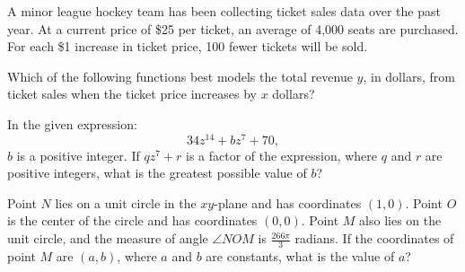 \vspace{0.75em}


\vspace{2em}
\newpage

\noindent\markforreview
\vspace{1em}

A minor league hockey team has been collecting ticket sales data over the past year.
At a current price of \$25 per ticket, an average of 4{,}000 seats are purchased.
For each \$1 increase in ticket price, 100 fewer tickets will be sold.

Which of the following functions best models the total revenue \(y\), in dollars,
from ticket sales when the ticket price increases by \(x\) dollars?

\vspace{0.75em}


\vspace{2em}
\newpage

\noindent\markforreview
\vspace{1em}

In the given expression:
\[
34z^{14} + bz^7 + 70,
\]
\(b\) is a positive integer. If \(qz^7 + r\) is a factor of the expression, where \(q\) and \(r\) are positive integers,
what is the greatest possible value of \(b\)?

\vspace{2em}
\newpage

\noindent\markforreview
\vspace{1em}

Point \(N\) lies on a unit circle in the \(xy\)-plane and has coordinates \((1, 0)\).
Point \(O\) is the center of the circle and has coordinates \((0, 0)\).
Point \(M\) also lies on the unit circle, and the measure of angle \(\angle NOM\) is \(\frac{266\pi}{3}\) radians.
If the coordinates of point \(M\) are \((a, b)\), where \(a\) and \(b\) are constants, what is the value of \(a\)?

\vspace{0.75em}


